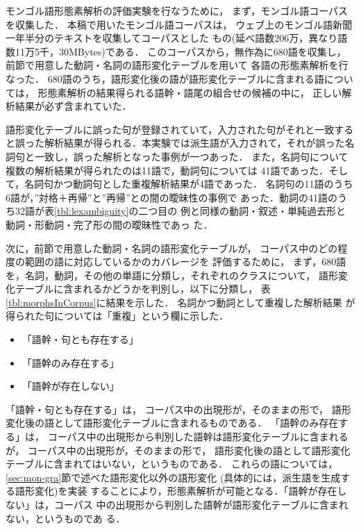 モンゴル語形態素解析の評価実験を行なうために，
まず，モンゴル語コーパスを収集した．
本稿で用いたモンゴル語コーパスは，
ウェブ上のモンゴル語新聞一年半分のテキストを収集してコーパスとした
もの(延べ語数206万，異なり語数11万5千，30MBytes)である．
このコーパスから，無作為に680語を収集し，
前節で用意した動詞・名詞の語形変化テーブルを用いて
各語の形態素解析を行なった．
680語のうち，語形変化後の語が語形変化テーブルに含まれる語については，
形態素解析の結果得られる語幹・語尾の組合せの候補の中に，
正しい解析結果が必ず含まれていた．

語形変化テーブルに誤った句が登録されていて，入力された句がそれと一致する
と誤った解析結果が得られる．本実験では派生語が入力されて，それが誤った名
詞句と一致し，誤った解析となった事例が一つあった．
また，名詞句について複数の解析結果が得られたのは11語で，動詞句については
41語であった．そして，名詞句かつ動詞句とした重複解析結果が4語であった．
名詞句の11語のうち6語が，''対格＋再帰''と''再帰''との間の曖昧性の事例で
あった．動詞の41語のうち32語が表\ref{tbl:lexambiguity}の二つ目の
例と同様の動詞・叙述・単純過去形と動詞・形動詞・完了形の間の曖昧性であっ
た．


次に，前節で用意した動詞・名詞の語形変化テーブルが，
コーパス中のどの程度の範囲の語に対応しているかのカバレージを
評価するために，
まず，680語を，名詞，動詞，その他の単語に分類し，それぞれのクラスについて，
語形変化テーブルに含まれるかどうかを判別し，以下に分類し，
表\ref{tbl:morphsInCorpus}に結果を示した．
名詞かつ動詞として重複した解析結果
が得られた句については「重複」という欄に示した．


\begin{itemize}
 \item 「語幹・句とも存在する」 
 \item 「語幹のみ存在する」 
 \item 「語幹が存在しない」 
\end{itemize}

「語幹・句とも存在する」は， 
コーパス中の出現形が，そのままの形で，
語形変化後の語として語形変化テーブルに含まれるものである．
「語幹のみ存在する」は，
コーパス中の出現形から判別した語幹は語形変化テーブルに含まれるが，
コーパス中の出現形が，そのままの形で，
語形変化後の語として語形変化テーブルに含まれてはいない，というものである．
これらの語については，\ref{sec:mon-gra}節で述べた語形変化以外の語形変化
(具体的には，派生語を生成する語形変化)を実装
することにより，形態素解析が可能となる．「語幹が存在しない」は，コーパス
中の出現形から判別した語幹が語形変化テーブルに含まれない，というものであ
る．


